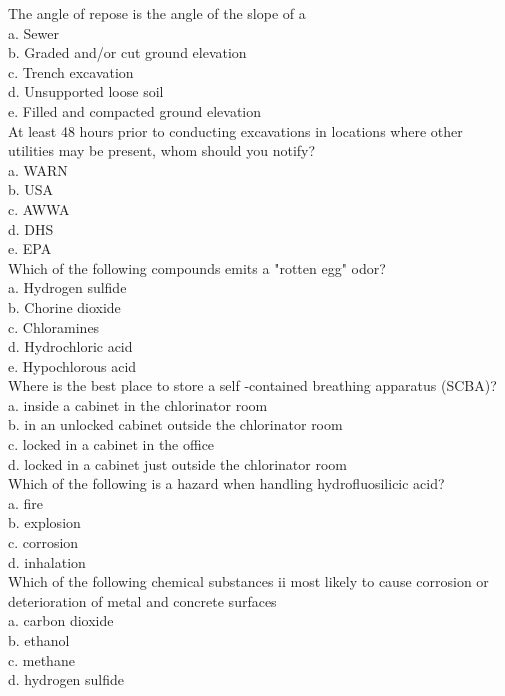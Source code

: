 The angle of repose is the angle of the slope of a\\
a. Sewer\\
b. Graded and/or cut ground elevation\\
c. Trench excavation\\
d. Unsupported loose soil\\
e. Filled and compacted ground elevation\\

At least 48 hours prior to conducting excavations in locations where other utilities may be present, whom should you notify?\\
a. WARN\\
b. USA\\
c. AWWA\\
d. DHS\\
e. EPA\\

Which of the following compounds emits a "rotten egg" odor?\\
a. Hydrogen sulfide\\
b. Chorine dioxide\\
c. Chloramines\\
d. Hydrochloric acid\\
e. Hypochlorous acid\\

Where is the best place to store a self -contained breathing apparatus (SCBA)?\\
a.	inside a cabinet in the chlorinator room\\
b.	in  an unlocked cabinet outside the chlorinator room\\
c.	locked in a cabinet in the office\\
d.	locked in a cabinet just outside the chlorinator room\\

Which of the following is a hazard when handling hydrofluosilicic acid?\\
a.	fire\\
b.	explosion\\
c.	corrosion\\
d.	inhalation\\

Which of the following chemical substances ii most likely to cause corrosion or deterioration of metal and concrete surfaces\\
a.	carbon dioxide\\
b.	ethanol\\
c.	methane\\
d.	hydrogen sulfide\\


